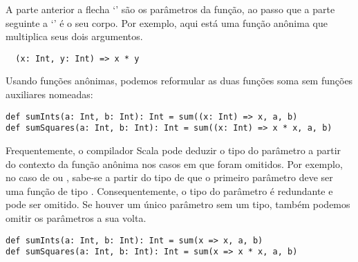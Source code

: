A parte anterior a flecha `\code{=>}' s\~{a}o os par\^{a}metros da fun\c{c}\~{a}o, ao passo que a parte
seguinte a `\code{=>}' \'{e} o seu corpo.
Por exemplo, aqui est\'{a} uma fun\c{c}\~{a}o an\^{o}nima que multiplica seus dois argumentos.
\begin{lstlisting}
  (x: Int, y: Int) => x * y
\end{lstlisting}
Usando fun\c{c}\~{o}es an\^{o}nimas, podemos reformular as duas fun\c{c}\~{o}es soma sem
fun\c{c}\~{o}es auxiliares nomeadas:
\begin{lstlisting}
def sumInts(a: Int, b: Int): Int = sum((x: Int) => x, a, b)
def sumSquares(a: Int, b: Int): Int = sum((x: Int) => x * x, a, b)
\end{lstlisting}

Frequentemente, o compilador Scala pode deduzir o tipo do par\^{a}metro a partir
do contexto da fun\c{c}\~{a}o an\^{o}nima nos casos em que foram omitidos.
Por exemplo, no caso de  ou , sabe-se a partir do 
tipo de  que o primeiro par\^{a}metro deve ser uma fun\c{c}\~{a}o de tipo .
Consequentemente, o tipo do par\^{a}metro  \'{e} redundante e pode ser omitido. Se
houver um \'{u}nico par\^{a}metro sem um tipo, tamb\'{e}m podemos omitir os par\^{a}metros a sua volta. 
   
\begin{lstlisting}
def sumInts(a: Int, b: Int): Int = sum(x => x, a, b)
def sumSquares(a: Int, b: Int): Int = sum(x => x * x, a, b)
\end{lstlisting}

